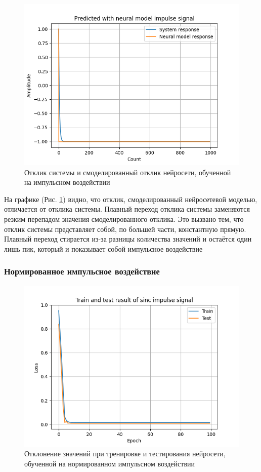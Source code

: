 \begin{figure}[H]
	\centering
	\includegraphics[width=1\linewidth]{body/images/Predicted-with-neural-model-impulse-signal.png}
	\caption{Отклик системы и смоделированный отклик нейросети, обученной на импульсном воздействии}
	\label{fig:20}
\end{figure}

На графике (Рис. \ref{fig:20}) видно, что отклик, смоделированный нейросетевой моделью, отличается от отклика системы. Плавный переход отклика системы
заменяются резким перепадом значения смоделированного отклика. Это вызвано тем, что отклик системы представляет собой, по большей части,
константную прямую. Плавный переход стирается из-за разницы количества значений и остаётся один лишь пик, который и показывает собой импульсное воздействие


\subsubsection{Нормированное импульсное воздействие}

\begin{figure}[H]
	\centering
	\includegraphics[width=1\linewidth]{body/images/Train-and-test-result-of-sinc-impulse-signal.png}
	\caption{Отклонение значений при тренировке и тестирования нейросети, обученной на нормированном импульсном воздействии}
	\label{fig:21}
\end{figure}

